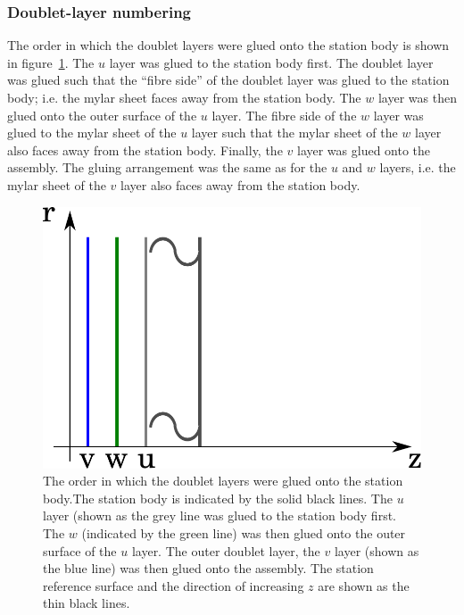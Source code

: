 \subsubsection{Doublet-layer numbering}
\label{SubSubSect:SciFiDblNmbrng}

The order in which the doublet layers were glued onto the station body is shown in figure~\ref{Fig:DblLyrOrder}. The $u$ layer was glued to the station body first. The doublet layer was glued such that the ``fibre side'' of the doublet layer was glued to the station body; i.e. the mylar sheet faces away from the station body. The $w$ layer was then glued onto the outer surface of the $u$ layer. The fibre side of the $w$ layer was glued to the mylar sheet of the $u$ layer such that the mylar sheet of the $w$ layer also faces away from the station body. Finally, the $v$ layer was glued onto the assembly. The gluing arrangement was the same as for the $u$ and $w$ layers, i.e. the mylar sheet of the $v$ layer also faces away from the station body. 


\begin{figure}
  \begin{center}
    \includegraphics[width=0.65\linewidth]{detectors/tracker/02-Definitions/Figures/doublet-layer-order.pdf}
  \end{center}
  \caption{ The order in which the doublet layers were glued onto the station body.The station body is indicated by the solid black lines. The $u$ layer (shown as the grey line was glued to the station body first. The $w$ (indicated by the green line) was then glued onto the outer surface of the $u$ layer.  The outer doublet layer, the $v$ layer (shown as the blue line) was then glued onto the assembly. The station reference surface and the direction of increasing $z$  are shown as the thin black lines.}
  \label{Fig:DblLyrOrder}
\end{figure}

